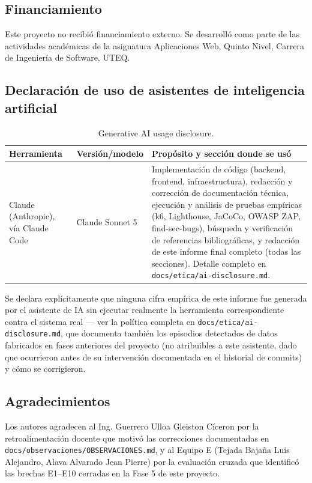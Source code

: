 \subsection*{Financiamiento}
Este proyecto no recibió financiamiento externo. Se desarrolló como parte de las actividades académicas
de la asignatura Aplicaciones Web, Quinto Nivel, Carrera de Ingeniería de Software, UTEQ.

\subsection*{Declaración de uso de asistentes de inteligencia artificial}

\begin{table}[H]
\centering
\small
\begin{tabular}{p{3cm}p{2.5cm}p{7.5cm}}
\toprule
\textbf{Herramienta} & \textbf{Versión/modelo} & \textbf{Propósito y sección donde se usó} \\
\midrule
Claude (Anthropic), vía Claude Code & Claude Sonnet 5 & Implementación de código (backend, frontend,
infraestructura), redacción y corrección de documentación técnica, ejecución y análisis de pruebas
empíricas (k6, Lighthouse, JaCoCo, OWASP ZAP, find-sec-bugs), búsqueda y verificación de referencias
bibliográficas, y redacción de este informe final completo (todas las secciones). Detalle completo en
\texttt{docs/etica/ai-disclosure.md}. \\
\bottomrule
\end{tabular}
\caption{Generative AI usage disclosure.}
\end{table}

Se declara explícitamente que ninguna cifra empírica de este informe fue generada por el asistente de IA
sin ejecutar realmente la herramienta correspondiente contra el sistema real --- ver la política completa
en \texttt{docs/etica/ai-disclosure.md}, que documenta también los episodios detectados de datos
fabricados en fases anteriores del proyecto (no atribuibles a este asistente, dado que ocurrieron antes
de su intervención documentada en el historial de commits) y cómo se corrigieron.

\subsection*{Agradecimientos}
Los autores agradecen al Ing. Guerrero Ulloa Gleiston Cíceron por la retroalimentación docente que
motivó las correcciones documentadas en \texttt{docs/observaciones/OBSERVACIONES.md}, y al Equipo E
(Tejada Bajaña Luis Alejandro, Alava Alvarado Jean Pierre) por la evaluación cruzada que identificó las
brechas E1--E10 cerradas en la Fase 5 de este proyecto.
\newpage
